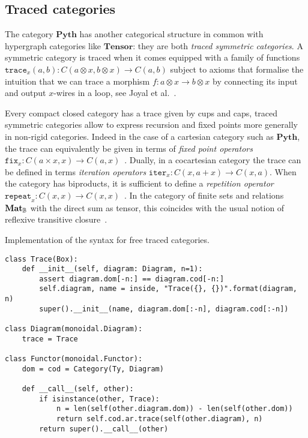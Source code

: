 
\subsection{Traced categories} \label{subsection:traced}

The category $\mathbf{Pyth}$ has another categorical structure in common with hypergraph categories like $\mathbf{Tensor}$: they are both \emph{traced symmetric categories}.
A symmetric category is traced when it comes equipped with a family of functions $\mathtt{trace}_x(a, b) : C(a \otimes x, b \otimes x) \to C(a, b)$ subject to axioms that formalise the intuition that we can trace a morphism $f : a \otimes x \to b \otimes x$ by connecting its input and output $x$-wires in a loop, see Joyal et al.~\cite{JoyalEtAl96}.

Every compact closed category has a trace given by cups and caps, traced symmetric categories allow to express recursion and fixed points more generally in non-rigid categories.
Indeed in the case of a cartesian category such as $\mathbf{Pyth}$, the trace can equivalently be given in terms of \emph{fixed point operators} $\mathtt{fix}_x : C(a \times x, x) \to C(a, x)$~\cite[Proposition~6.8]{Selinger10}.
Dually, in a cocartesian category the trace can be defined in terms \emph{iteration operators} $\mathtt{iter}_x : C(x, a + x) \to C(x, a)$.
When the category has biproducts, it is sufficient to define a \emph{repetition operator} $\mathtt{repeat}_x : C(x, x) \to C(x, x)$~\cite[Proposition~6.11]{Selinger10}.
In the category of finite sets and relations $\mathbf{Mat}_{\mathbb{B}}$ with the direct sum as tensor, this coincides with the usual notion of reflexive transitive closure~\cite[Proposition~6.3]{JoyalEtAl96}.

\begin{python}
{\normalfont Implementation of the syntax for free traced categories.}

\begin{verbatim}
class Trace(Box):
    def __init__(self, diagram: Diagram, n=1):
        assert diagram.dom[-n:] == diagram.cod[-n:]
        self.diagram, name = inside, "Trace({}, {})".format(diagram, n)
        super().__init__(name, diagram.dom[:-n], diagram.cod[:-n])

class Diagram(monoidal.Diagram):
    trace = Trace

class Functor(monoidal.Functor):
    dom = cod = Category(Ty, Diagram)

    def __call__(self, other):
        if isinstance(other, Trace):
            n = len(self(other.diagram.dom)) - len(self(other.dom))
            return self.cod.ar.trace(self(other.diagram), n)
        return super().__call__(other)
\end{verbatim}
\end{python}

